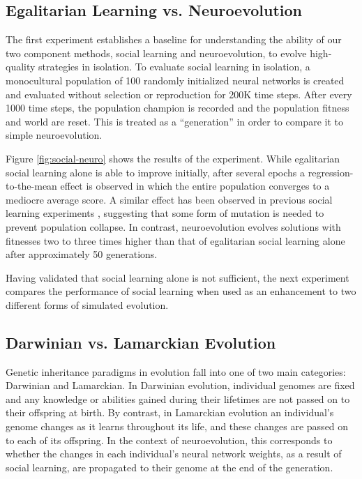 \documentclass{sig-alternate}
\begin{document}
\subsection{Egalitarian Learning vs. Neuroevolution}

The first experiment establishes a baseline for understanding the ability of our two component methods, social learning and neuroevolution, to evolve high-quality strategies in isolation. To evaluate social learning in isolation, a monocultural population of 100 randomly initialized neural networks is created and evaluated without selection or reproduction for 200K time steps. After every 1000 time steps, the population champion is recorded and the population fitness and world are reset. This is treated as a ``generation'' in order to compare it to simple neuroevolution.

Figure \ref{fig:social-neuro} shows the results of the experiment. While egalitarian social learning alone is able to improve initially, after several epochs a regression-to-the-mean effect is observed in which the entire population converges to a mediocre average score. A similar effect has been observed in previous social learning experiments \cite{denaro1996cultural}, suggesting that some form of mutation is needed to prevent population collapse. In contrast, neuroevolution evolves solutions with fitnesses two to three times higher than that of egalitarian social learning alone after approximately 50 generations.

Having validated that social learning alone is not sufficient, the next experiment compares the performance of social learning when used as an enhancement to two different forms of simulated evolution.

\subsection{Darwinian vs. Lamarckian Evolution}

Genetic inheritance paradigms in evolution fall into one of two main categories: Darwinian and Lamarckian. In Darwinian evolution, individual genomes are fixed and any knowledge or abilities gained during their lifetimes are not passed on to their offspring at birth. By contrast, in Lamarckian evolution an individual's genome changes as it learns throughout its life, and these changes are passed on to each of its offspring. In the context of neuroevolution, this corresponds to whether the changes in each individual's neural network weights, as a result of social learning, are propagated to their genome at the end of the generation.
\end{document}
